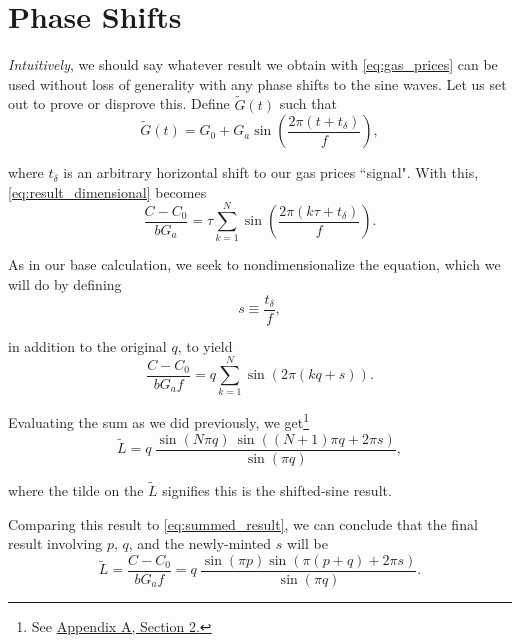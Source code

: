 \documentclass[11pt]{article}
\begin{document}
\section*{Phase Shifts}
\label{sec:phase_shifts}
\textit{Intuitively}, we should say whatever result we obtain with \eqref{eq:gas_prices} can be used without loss of generality with any phase shifts to the sine waves. Let us set out to prove or disprove this. Define $\tilde{G}(t)$ such that
\begin{equation}
\tilde{G}(t) = G_0 + G_a \sin \left( \frac{2 \pi (t + t_{\delta})}{f} \right) \label{eq:gas_prices_shifted},
\end{equation} 

where $t_{\delta}$ is an arbitrary horizontal shift to our gas prices ``signal". With this, \eqref{eq:result_dimensional} becomes
\begin{equation}
\frac{C - C_0}{b G_a} = \tau \sum_{k=1}^{N}{\sin \left( \frac{2 \pi (k \tau + t_{\delta})}{f}\right)} \label{eq:result_dimensional_shifted}.
\end{equation}

As in our base calculation, we seek to nondimensionalize the equation, which we will do by defining
$$
s \equiv \frac{t_{\delta}}{f},
$$

in addition to the original $q$, to yield
\begin{equation}
\frac{C - C_0}{b G_a f} = q \sum_{k=1}^{N}{\sin \left( 2 \pi (kq + s) \right)}. \label{eq:result_dimensionless_shifted}
\end{equation}

Evaluating the sum as we did previously, we get\footnote{See \hyperref[subsubsec:sumwith_phase_shift]{Appendix A, Section 2.}}
\begin{equation}
\tilde{L} = q \: \frac{\sin(N\pi q) \: \sin((N+1)\pi q + 2\pi s)}{\sin(\pi q)}, \label{eq:summed_result_shifted}
\end{equation}

where the tilde on the $\tilde{L}$ signifies this is the shifted-sine result. \\

\par Comparing this result to \eqref{eq:summed_result}, we can conclude that the final result involving $p$, $q$, and the newly-minted $s$ will be
\begin{equation}
\boxed{\tilde{L} = \frac{C - C_0}{b G_a f} = q \: \frac{\sin(\pi p) \sin(\pi (p+q) + 2\pi s)}{\sin(\pi q)}}. \label{eq:result_final_shifted}
\end{equation}
\end{document}
